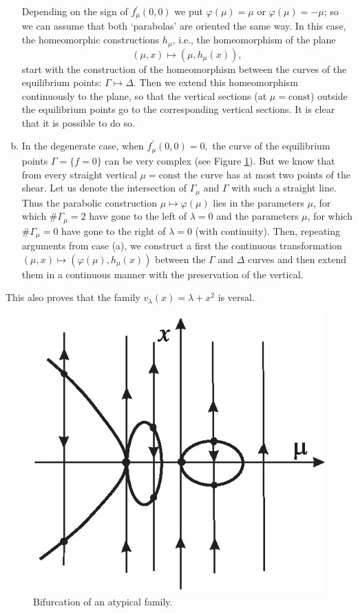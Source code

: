 \begin{example}
\begin{enumerate}[(a)]
		Depending on the sign of $f_{\mu }^{\prime }(0,0)$ we put $\varphi
		\left( \mu \right) =\mu $ or $\varphi
		\left( \mu \right) =-\mu $; so we can assume that both `parabolas' are oriented the same way. In this case, the homeomorphic constructions $h_{\mu }$, i.e., the homeomorphism of the plane $$
		\left( \mu ,x\right) \longmapsto \left( \mu ,h_{\mu }(x)\right) ,
		$$
		start with the construction of the homeomorphism between the curves of the equilibrium points: $\Gamma \longmapsto \Delta $. Then we extend this homeomorphism continuously to the plane, so that the vertical sections (at $\mu =\textrm{const}$) outside the equilibrium points go to the corresponding vertical sections. It is clear that it is possible to do so.
		\item In the degenerate case, when $f_{\mu }^{\prime }(0,0)=0,$ the curve of the equilibrium points $\Gamma =\{f=0\}$ can be very complex (see Figure \ref{fig:3.5}). But we know that from every straight vertical $\mu =\textrm{const}$ the curve has at most two points of the shear. Let us denote the intersection of $\Gamma _{\mu }$ and $\Gamma$ with such a straight line. Thus the parabolic construction $\mu \longmapsto	\varphi (\mu )$ lies in the parameters $\mu$, for which $\#\Gamma _{\mu }=2$ have gone to the left of $\lambda =0$ and the parameters $\mu$, for which $\#\Gamma _{\mu }=0$ have gone to the right of $\lambda =0$ (with continuity). Then, repeating arguments from case (a), we construct a first the continuous transformation $\left( \mu ,x\right) \longmapsto (\varphi (\mu ),h_{\mu }(x))$ between the $\Gamma $ and $\Delta $ curves and then extend them in a continuous manner with the preservation of the vertical.
	\end{enumerate}
	This also proves that the family $v_{\lambda }(x)=\lambda +x^{2}$ is versal.
	\begin{figure}[!ht]
		\centering
		\includegraphics [scale=1]{jtr35}
		\caption{Bifurcation of an atypical family.}
		\label{fig:3.5}
	\end{figure}
\end{example}

